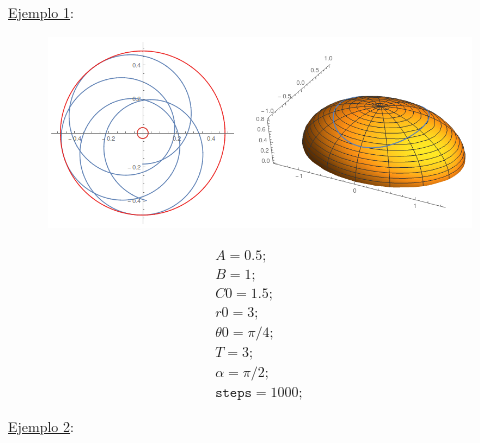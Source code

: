 \documentclass[a4paper,10pt]{article}
\numberwithin{equation}{section}
\begin{document}
\underline{Ejemplo 1}:

\begin{multicols}{2}

\begin{figure}[H]
\center
\includegraphics[scale=0.35]{problema5fig2}
\label{fig:problema5fig2}
\end{figure}

\begin{equation*}
\begin{aligned}
 A = 0.5; \\
 B = 1; \\
 C0 = 1.5; \\ 
 r0 = 3; \\
 \theta 0 = \pi/4; \\
 T = 3; \\
 \alpha = \pi/2; \\ 
 \texttt{steps} = 1000;
\end{aligned}
\end{equation*}

\end{multicols}

\underline{Ejemplo 2}:
\end{document}
